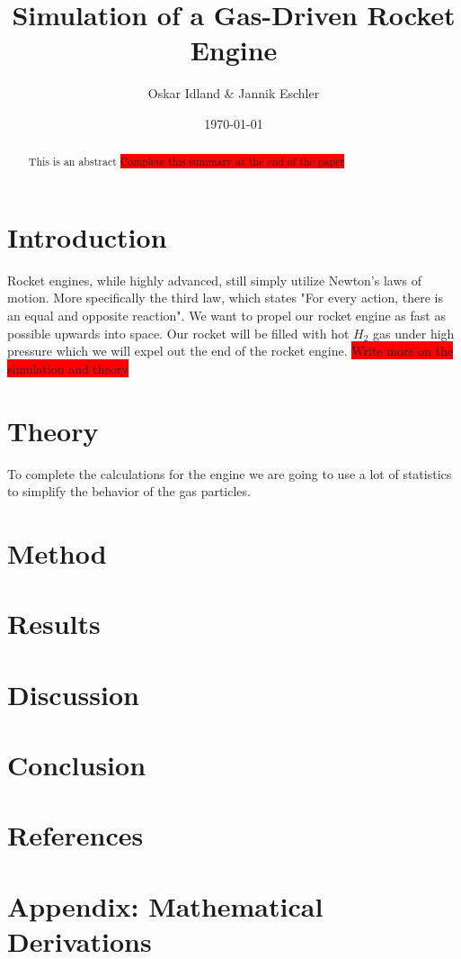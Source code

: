 \documentclass[reprint,english,notitlepage]{revtex4-2}
\begin{document}
\title{Simulation of a Gas-Driven Rocket Engine}
\author{Oskar Idland \& Jannik Eschler}
\date{\today}

\begin{abstract}
This is an abstract \colorbox{red}{Complete this summary at the end of the paper}
\end{abstract}
\maketitle

\section{Introduction}
	Rocket engines, while highly advanced, still simply utilize Newton's laws of motion. More specifically the third law, which states "For every action, there is an equal and opposite reaction". We want to propel our rocket engine as fast as possible upwards into space.
	Our rocket will be filled with hot $ H_2 $ gas under high pressure which we will expel out the end of the rocket engine. \colorbox{red}{Write more on the simulation and theory}
\section{Theory}
To complete the calculations for the engine we are going to use a lot of statistics to simplify the behavior of the gas particles. 
\section{Method}


\section{Results}
\section{Discussion}
\section{Conclusion}
\section{References}
\section{Appendix: Mathematical Derivations}
\end{document}
